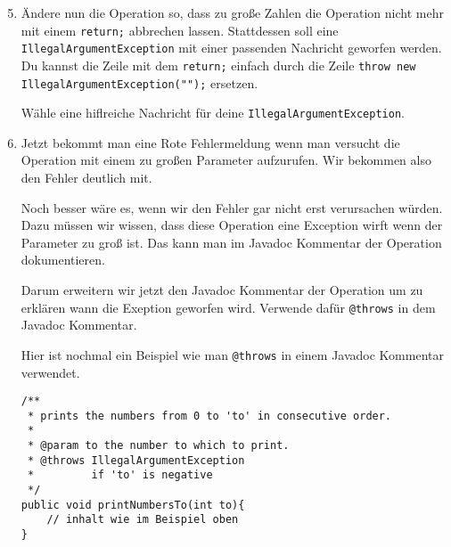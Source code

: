 \begin{enumerate}\setcounter{enumi}{4}
	\item
		Ändere nun die Operation so, dass zu große Zahlen die Operation nicht mehr mit einem \lstinline{return;} abbrechen lassen.
		Stattdessen soll eine \lstinline{IllegalArgumentException} mit einer passenden Nachricht geworfen werden.
		Du kannst die Zeile mit dem \lstinline{return;} einfach durch die Zeile \lstinline{throw new IllegalArgumentException("");} ersetzen.

		Wähle eine hiflreiche Nachricht für deine \lstinline{IllegalArgumentException}.

	\item
		Jetzt bekommt man eine Rote Fehlermeldung wenn man versucht die Operation mit einem zu großen Parameter aufzurufen.
		Wir bekommen also den Fehler deutlich mit.

		Noch besser wäre es, wenn wir den Fehler gar nicht erst verursachen würden.
		Dazu müssen wir wissen, dass diese Operation eine Exception wirft wenn der Parameter zu groß ist.
		Das kann man im Javadoc Kommentar der Operation dokumentieren.
		
		Darum erweitern wir jetzt den Javadoc Kommentar der Operation um zu erklären wann die Exeption geworfen wird. 
		Verwende dafür \lstinline{@throws} in dem Javadoc Kommentar.

		Hier ist nochmal ein Beispiel wie man \lstinline{@throws} in einem Javadoc Kommentar verwendet.

		\begin{lstlisting}
/**
 * prints the numbers from 0 to 'to' in consecutive order.
 * 
 * @param to the number to which to print.
 * @throws IllegalArgumentException
 *         if 'to' is negative
 */
public void printNumbersTo(int to){
    // inhalt wie im Beispiel oben
}
		\end{lstlisting}
\end{enumerate}
\newpage
